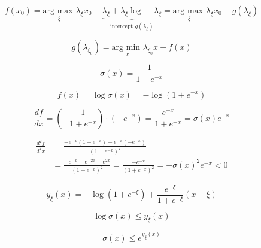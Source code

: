 \documentclass[a4paper,10pt]{article}
\newif\ifen
\newcommand{\en}[1]{\ifen#1\fi}
\begin{document}
%
\en{We have succeeded in approximating the convex function $f(x_0)$ by a simpler, linear function $y_\xi(x_0)$.}
%
\en{The price we have paid is that we have introduced a variational parameter $\xi$, and to obtain the tightest bound we must optimize with respect to $\xi$.}
%
\begin{equation}
 f(x_0)  = \underset{\xi}{\text{arg max }}  \lambda_\xi x_0 - \underbrace{\lambda_\xi + \lambda_\xi \log -\lambda_\xi}_{\text{intercept }g(\lambda_\xi)} = \underset{\xi}{\text{arg max }} \lambda_\xi x_0 - g(\lambda_\xi)
\end{equation}
%
\en{Now, instead of fixing $x_0$ and varying $\xi$, we can consider a particular $\xi_0$ and then find the $x$ with minium distance between the tangent and the function.}
%
\begin{equation}
 g(\lambda_{\xi_0}) = \underset{x}{\text{arg min }} \lambda_{\xi_0} x - f(x) 
\end{equation}
%
\en{We see that the functions $f(x)$ and $g(\lambda_\xi)$ play a dual role.}

\vspace{0.3cm} %

\en{An important example, which arises frequently in pattern recognition, is the logistic sigmoid function defined by}
%
\begin{equation}
 \sigma(x) = \frac{1}{1 + e^{-x}}
\end{equation}
%
\en{As it stands this function is neither convex nor concave.}
%
\en{However, if we take the logarithm we obtain a function which is concave.}
%
\begin{equation}
 f(x) = \log \sigma(x) =  - \log(1 + e^{-x})
\end{equation}
%
\en{As is verified by finding the second derivative.}
%
\en{We begin by calculating the first derivative.}
%
\begin{equation}
 \frac{df}{dx} = (- \frac{1}{1 + e^{-x}}) \cdot(-e^{-x}) =  \frac{e^{-x}}{1 + e^{-x}} =\sigma(x) e^{-x}
\end{equation}
%
\en{Then we can obtain the second derivative.}
%
\begin{equation}
\begin{split}
 \frac{d^2f}{d^2x} & = \frac{-e^{-x}(1 + e^{-x}) - e^{-x}(-e^{-x})}{(1 + e^{-x})^2} \\
 & = \frac{-e^{-x} - e^{-2x} + e^{2x}}{(1 + e^{-x})^2} =  \frac{-e^{-x}}{(1 + e^{-x})^2} = - \sigma(x)^2 e^{-x} < 0
 \end{split}
\end{equation}
%
\en{Therefore, the log logistic sigmoid function $f(x)$ is concave, so we can find the upper bound on the log sigmoid.}
%
\begin{equation}
 y_\xi(x) = -\log (1 + e^{-\xi}) + \frac{e^{-\xi}}{1 + e^{-\xi}} (x - \xi)
\end{equation}
%
\en{We know that}
%
\begin{equation}
 \log \sigma(x) \leq y_\xi(x) 
\end{equation}
%
\en{And taking the exponential, we obtain an upper bound on the logistic sigmoid itself.}
%
\begin{equation}
 \sigma(x) \leq e^{y_\xi(x)}
\end{equation}
\end{document}
